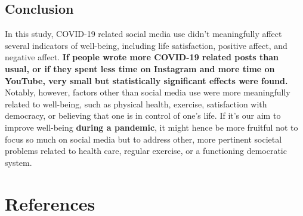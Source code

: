 \documentclass[
  man,mask]{apa7}
\begin{document}
\hypertarget{conclusion}{%
\subsection{Conclusion}\label{conclusion}}

In this study, COVID-19 related social media use didn't meaningfully affect several indicators of well-being, including life satisfaction, positive affect, and negative affect.
\textbf{If people wrote more COVID-19 related posts than usual, or if they spent less time on Instagram and more time on YouTube, very small but statistically significant effects were found.}
Notably, however, factors other than social media use were more meaningfully related to well-being, such as physical health, exercise, satisfaction with democracy, or believing that one is in control of one's life.
If it's our aim to improve well-being \textbf{during a pandemic}, it might hence be more fruitful not to focus so much on social media but to address other, more pertinent societal problems related to health care, regular exercise, or a functioning democratic system.

\newpage

\hypertarget{references}{%
\section{References}\label{references}}
\end{document}
